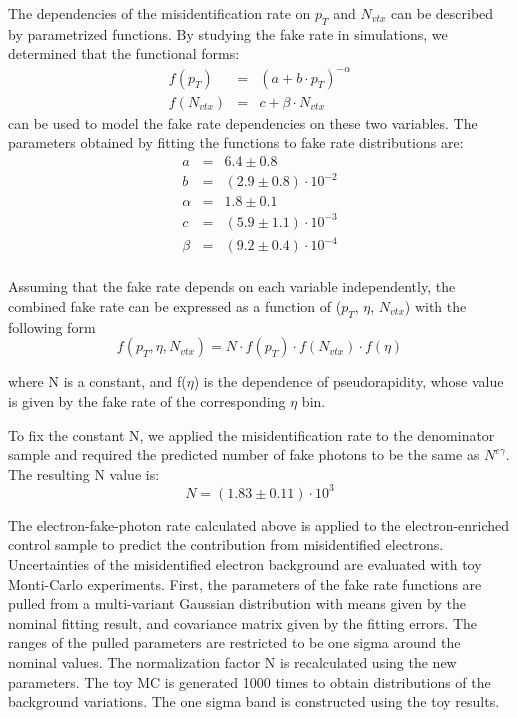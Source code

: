 \documentclass[thesis.tex]{subfiles}
\renewcommand\_{\textunderscore\allowbreak}
\begin{document}
The dependencies of the misidentification rate on $p_T$ and $N_{vtx}$ can be described by parametrized functions. By studying the fake rate in simulations, we determined that the functional forms: 
\begin{eqnarray*}
	f(p_{T})   &=& ( a + b\cdot p_T)^{-\alpha} \\
	f(N_{vtx}) &=& c + \beta \cdot N_{vtx}
\end{eqnarray*}
can be used to model the fake rate dependencies on these two variables. The parameters obtained by fitting the functions to fake rate distributions are: 
\begin{eqnarray*}
	a   &=& 6.4 \pm 0.8  \\
	b   &=& (2.9 \pm 0.8) \cdot 10^{-2} \\
	\alpha &=& 1.8 \pm 0.1 \\
	c &=& (5.9 \pm 1.1) \cdot 10^{-3} \\
	\beta &=& (9.2 \pm 0.4) \cdot 10^{-4} \\
\end{eqnarray*}

 Assuming that the fake rate depends on each variable independently, the combined fake rate can be expressed as a function of ($p_T$, $\eta$, $N_{vtx}$) with the following form 
\begin{equation} 
	f(p_{T}, \eta, N_{vtx}) = N \cdot f(p_T) \cdot f(N_{vtx}) \cdot f(\eta)
\end{equation}

where N is a constant, and f($\eta$) is the dependence of pseudorapidity, whose value is given by the fake rate of the corresponding $\eta$ bin. 

To fix the constant N, we applied the misidentification rate to the denominator sample and required the predicted number of fake photons to be the same as $N^{e\gamma}$. The resulting N value is: 
\begin{equation} 
	N = (1.83 \pm 0.11) \cdot 10^{3}
\end{equation}


The electron-fake-photon rate calculated above is applied to the electron-enriched control sample to predict the contribution from misidentified electrons. Uncertainties of the misidentified electron background are evaluated with toy Monti-Carlo experiments. First, the parameters of the fake rate functions are pulled from a multi-variant Gaussian distribution with means given by the nominal fitting result, and covariance matrix given by the fitting errors. The ranges of the pulled parameters are restricted to be one sigma around the nominal values. The normalization factor N is recalculated using the new parameters. The toy MC is generated 1000 times to obtain distributions of the background variations. The one sigma band is constructed using the toy results.
\end{document}
